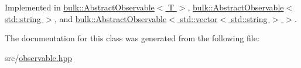 Implemented in \hyperlink{classbulk_1_1AbstractObservable_a39be332eeed3b432a461faae184ba34b}{bulk\+::\+Abstract\+Observable$<$ T $>$}, \hyperlink{classbulk_1_1AbstractObservable_a39be332eeed3b432a461faae184ba34b}{bulk\+::\+Abstract\+Observable$<$ std\+::string $>$}, and \hyperlink{classbulk_1_1AbstractObservable_a39be332eeed3b432a461faae184ba34b}{bulk\+::\+Abstract\+Observable$<$ std\+::vector$<$ std\+::string $>$ $>$}.



The documentation for this class was generated from the following file\+:\begin{DoxyCompactItemize}
\item 
src/\hyperlink{observable_8hpp}{observable.\+hpp}\end{DoxyCompactItemize}
